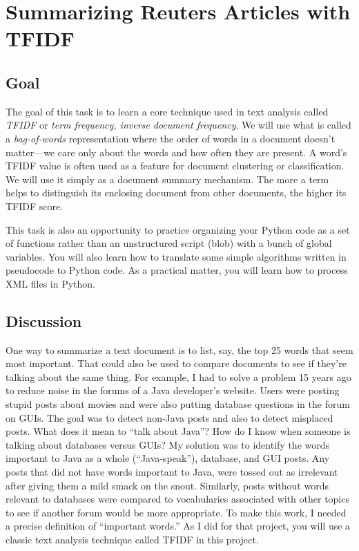 \chapter{Summarizing Reuters Articles with TFIDF}

\section{Goal}

\begin{fullwidth}

The goal of this task is to learn a core technique used in text analysis called {\em TFIDF} or {\em term frequency, inverse document frequency}.  We will use what is called a {\em bag-of-words} representation where the order of words in a document doesn't matter---we care only about the words and how often they are present. A word's TFIDF value is often used as a feature for document clustering or classification. We will use it simply as a document summary mechanism. The more a term helps to distinguish its enclosing document from other documents, the higher its TFIDF score.

This task is also an opportunity to practice organizing your Python code as a set of functions rather than an unstructured script (blob) with a bunch of global variables. You will also learn how to translate some simple algorithms written in pseudocode to Python code. As a practical matter, you will learn how to process XML files in Python.

\section{Discussion}

One way to summarize a text document is to list, say, the top 25 words that seem most important. That could also be used to compare documents to see if they're talking about the same thing. For example, I had to solve a problem 15 years ago to reduce noise in the forums of a Java developer's website.  Users were posting stupid posts about movies and were also putting database questions in the forum on GUIs. The goal was to detect non-Java posts and also to detect misplaced posts. What does it mean to ``talk about Java''?  How do I know when someone is talking about databases versus GUIs? My solution was to identify the words important to Java as a whole (``Java-speak''), database, and GUI posts.  Any posts that did not have words important to Java, were tossed out as irrelevant after giving them a mild smack on the snout. Similarly, posts without words relevant to databases were compared to vocabularies associated with other topics to see if another forum would be more appropriate. To make this work, I needed a precise definition of ``important words.'' As I did for that project, you will use a classic   text analysis technique called TFIDF in this project.


\end{fullwidth}
